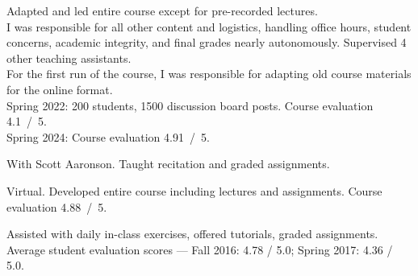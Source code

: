 \documentclass[11pt,letterpaper,serif]{moderncv}
\begin{document}
{
	\begin{adjustwidth}{.25in}{}
		Adapted and led entire course except for pre-recorded lectures.\\
		I was responsible for all other content and logistics, handling office hours, student concerns, academic integrity, and final grades nearly autonomously.
		Supervised 4 other teaching assistants.\\
		For the first run of the course,
		I was responsible for adapting old course materials for the online format.\\
		Spring 2022: 200 students, 1500 discussion board posts. Course evaluation 4.1~/~5.
		\\ Spring 2024: Course evaluation 4.91~/~5.
	\end{adjustwidth}
}

\smallskip

{
	\begin{adjustwidth}{.25in}{}
	With Scott Aaronson. Taught recitation and graded assignments.
	\end{adjustwidth}
}

\smallskip

{
	\begin{adjustwidth}{.25in}{}
		Virtual.
		Developed entire course including lectures and assignments.
		Course evaluation 4.88~/~5.
	\end{adjustwidth}
}

\smallskip

{
	\begin{adjustwidth}{.25in}{}
		Assisted with daily in-class exercises, offered tutorials, graded assignments. \newline
		Average student evaluation scores --- Fall 2016: 4.78 / 5.0; Spring 2017: 4.36 / 5.0.
	\end{adjustwidth}
}

\smallskip

\end{document}
